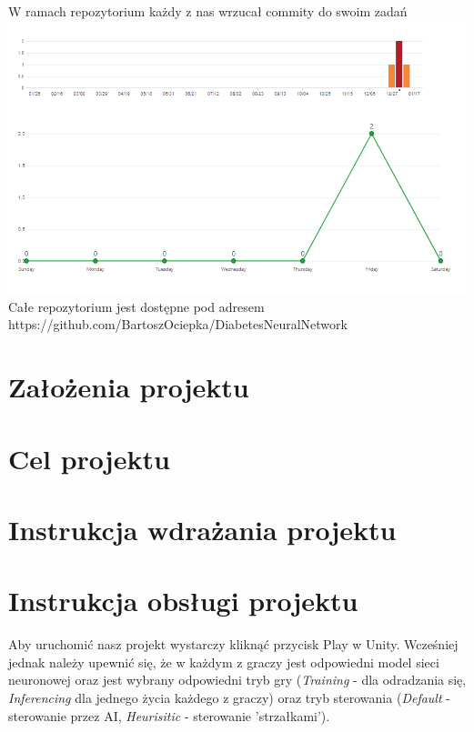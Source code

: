 \documentclass[12pt,a4paper]{article}
\begin{document}
W ramach repozytorium każdy z nas wrzucał commity do swoim zadań \\
\includegraphics[width=0.9\linewidth]{media/githubProof}\\
Całe repozytorium jest dostępne pod adresem \\https://github.com/BartoszOciepka/DiabetesNeuralNetwork




\section{Założenia projektu}




\section{Cel projektu}




\section{Instrukcja wdrażania projektu}




\section{Instrukcja obsługi projektu}
Aby uruchomić nasz projekt wystarczy kliknąć przycisk Play w Unity. Wcześniej jednak należy upewnić się, że w każdym z graczy jest odpowiedni model sieci neuronowej oraz jest wybrany odpowiedni tryb gry (\textit{Training} - dla odradzania się, \textit{Inferencing} dla jednego życia każdego z graczy) oraz tryb sterowania (\textit{Default} - sterowanie przez AI, \textit{Heurisitic} - sterowanie 'strzałkami').
\end{document}

